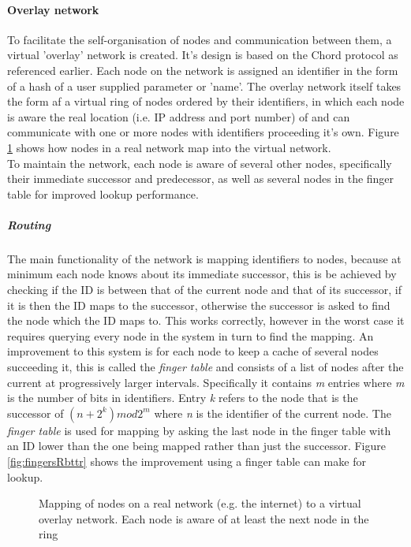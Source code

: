 \documentclass{article}
\begin{document}
\paragraph{Overlay network}
To facilitate the self-organisation of nodes and communication between them, a virtual 'overlay' network is created. It's design is based on the Chord protocol as referenced earlier. Each node on the network is assigned an identifier in the form of a hash of a user supplied parameter or 'name'. The overlay network itself takes the form af a virtual ring of nodes ordered by their identifiers, in which each node is aware the real location (i.e. IP address and port number) of and can communicate with one or more nodes with identifiers proceeding it's own. Figure \ref{fig:rtovmap} shows how nodes in a real network map into the virtual network.
\\
To maintain the network, each node is aware of several other nodes, specifically their immediate successor and predecessor, as well as several nodes in the finger table for improved lookup performance.

\subparagraph{Routing} The main functionality of the network is mapping identifiers to nodes, because at minimum each node knows about its immediate successor, this is be achieved by checking if the ID is between that of the current node and that of its successor, if it is then the ID maps to the successor, otherwise the successor is asked to find the node which the ID maps to. 
This works correctly, however in the worst case it requires querying every node in the system in turn to find the mapping. 
An improvement to this system is for each node to keep a cache of several nodes succeeding it, this is called the \textit{finger table} and consists of a list of nodes after the current at progressively larger intervals.
Specifically it contains \textit{m} entries where \textit{m} is the number of bits in identifiers. Entry \textit{k} refers to the node that is the successor of $(n + 2^k) mod 2^m$ where \textit{n} is the identifier of the current node.
The \textit{finger table} is used for mapping by asking the last node in the finger table with an ID lower than the one being mapped rather than just the successor.
Figure \ref{fig:fingersRbttr} shows the improvement using a finger table can make for lookup.

\begin{figure}
\centering
\def\svgwidth{\columnwidth}

\caption{Mapping of nodes on a real network (e.g. the internet) to a virtual overlay network. Each node is aware of at least the next node in the ring}
\label{fig:rtovmap}
\end{figure}
\end{document}
